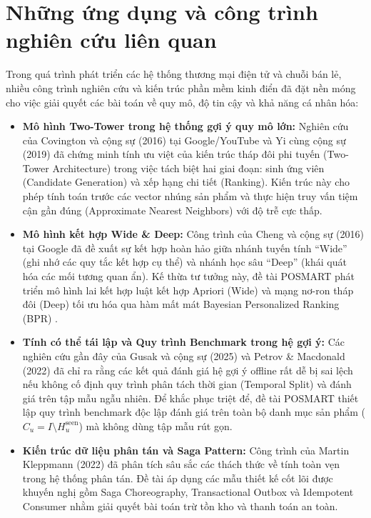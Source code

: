 \documentclass[12pt,a4paper]{report}
\begin{document}
\section{Những ứng dụng và công trình nghiên cứu liên quan}

Trong quá trình phát triển các hệ thống thương mại điện tử và chuỗi bán lẻ, nhiều công trình nghiên cứu và kiến trúc phần mềm kinh điển đã đặt nền móng cho việc giải quyết các bài toán về quy mô, độ tin cậy và khả năng cá nhân hóa:
\begin{itemize}
    \item \textbf{Mô hình Two-Tower trong hệ thống gợi ý quy mô lớn:} Nghiên cứu của Covington và cộng sự (2016) tại Google/YouTube \cite{covington2016_youtube} và Yi cùng cộng sự (2019) \cite{yi2019_ndr} đã chứng minh tính ưu việt của kiến trúc tháp đôi phi tuyến (Two-Tower Architecture) trong việc tách biệt hai giai đoạn: sinh ứng viên (Candidate Generation) và xếp hạng chi tiết (Ranking). Kiến trúc này cho phép tính toán trước các vector nhúng sản phẩm và thực hiện truy vấn tiệm cận gần đúng (Approximate Nearest Neighbors) với độ trễ cực thấp.
    \item \textbf{Mô hình kết hợp Wide \& Deep:} Công trình của Cheng và cộng sự (2016) tại Google \cite{cheng2016_wide_deep} đã đề xuất sự kết hợp hoàn hảo giữa nhánh tuyến tính ``Wide'' (ghi nhớ các quy tắc kết hợp cụ thể) và nhánh học sâu ``Deep'' (khái quát hóa các mối tương quan ẩn). Kế thừa tư tưởng này, đề tài POSMART phát triển mô hình lai kết hợp luật kết hợp Apriori (Wide) và mạng nơ-ron tháp đôi (Deep) tối ưu hóa qua hàm mất mát Bayesian Personalized Ranking (BPR) \cite{rendle2009_bpr}.
    \item \textbf{Tính có thể tái lập và Quy trình Benchmark trong hệ gợi ý:} Các nghiên cứu gần đây của Gusak và cộng sự (2025) \cite{gusak2025_time_split} và Petrov \& Macdonald (2022) \cite{petrov2022_a_systematic_review_and_replicability_study_of_bert4rec_fo} đã chỉ ra rằng các kết quả đánh giá hệ gợi ý offline rất dễ bị sai lệch nếu không cố định quy trình phân tách thời gian (Temporal Split) và đánh giá trên tập mẫu ngẫu nhiên. Để khắc phục triệt để, đề tài POSMART thiết lập quy trình benchmark độc lập đánh giá trên toàn bộ danh mục sản phẩm ($C_u = I \setminus H_u^{\text{seen}}$) mà không dùng tập mẫu rút gọn.
    \item \textbf{Kiến trúc dữ liệu phân tán và Saga Pattern:} Công trình của Martin Kleppmann (2022) \cite{manning2022} đã phân tích sâu sắc các thách thức về tính toàn vẹn trong hệ thống phân tán. Đề tài áp dụng các mẫu thiết kế cốt lõi được khuyến nghị gồm Saga Choreography, Transactional Outbox và Idempotent Consumer nhằm giải quyết bài toán trừ tồn kho và thanh toán an toàn.
\end{itemize}
\end{document}
